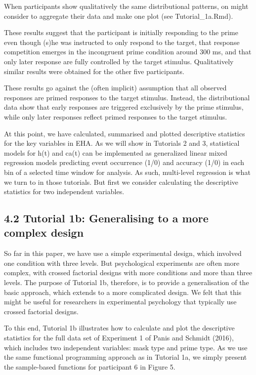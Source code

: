 \documentclass[
  man,floatsintext]{apa6}
\begin{document}
When participants show qualitatively the same distributional patterns, on might consider to aggregate their data and make one plot (see Tutorial\_1a.Rmd).

These results suggest that the participant is initially responding to the prime even though (s)he was instructed to only respond to the target, that response competition emerges in the incongruent prime condition around 300 ms, and that only later response are fully controlled by the target stimulus. Qualitatively similar results were obtained for the other five participants.

These results go against the (often implicit) assumption that all observed responses are primed responses to the target stimulus. Instead, the distributional data show that early responses are triggered exclusively by the prime stimulus, while only later responses reflect primed responses to the target stimulus.

At this point, we have calculated, summarised and plotted descriptive statistics for the key variables in EHA. As we will show in Tutorials 2 and 3, statistical models for h(t) and ca(t) can be implemented as generalized linear mixed regression models predicting event occurrence (1/0) and accuracy (1/0) in each bin of a selected time window for analysis. As such, multi-level regression is what we turn to in those tutorials. But first we consider calculating the descriptive statistics for two independent variables.

\subsection{4.2 Tutorial 1b: Generalising to a more complex design}\label{tutorial-1b-generalising-to-a-more-complex-design}

So far in this paper, we have use a simple experimental design, which involved one condition with three levels. But psychological experiments are often more complex, with crossed factorial designs with more conditions and more than three levels. The purpose of Tutorial 1b, therefore, is to provide a generalisation of the basic approach, which extends to a more complicated design. We felt that this might be useful for researchers in experimental psychology that typically use crossed factorial designs.

To this end, Tutorial 1b illustrates how to calculate and plot the descriptive statistics for the full data set of Experiment 1 of Panis and Schmidt (2016), which includes two independent variables: mask type and prime type. As we use the same functional programming approach as in Tutorial 1a, we simply present the sample-based functions for participant 6 in Figure 5.
\end{document}
